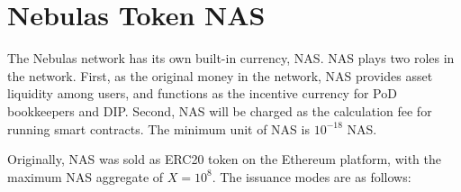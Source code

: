 \section{Nebulas Token NAS}
\label{sec:nascoin}

The Nebulas network has its own built-in currency, NAS. NAS plays two roles in the network. First, as the original money in the network, NAS provides asset liquidity among users, and functions as the incentive currency for PoD bookkeepers and DIP. Second, NAS will be charged as the calculation fee for running smart contracts. The minimum unit of NAS is $10^{-18}$ NAS.


Originally, NAS was sold as ERC20 token on the Ethereum platform, with the maximum NAS aggregate of $X = 10^8.$ The issuance modes are as follows:

